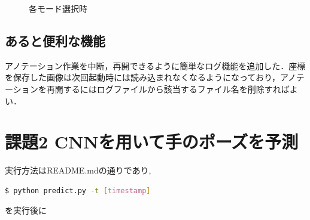 \documentclass[a4paper, 11pt]{article}
\begin{document}
\begin{figure}[H]
  \begin{center}
  \end{center}
	\caption{各モード選択時}
	\label{fig:set_keypoints}
\end{figure}

\subsection*{あると便利な機能}
アノテーション作業を中断，再開できるように簡単なログ機能を追加した．座標を保存した画像は次回起動時には読み込まれなくなるようになっており，アノテーションを再開するにはログファイルから該当するファイル名を削除すればよい．

\section*{課題2 CNNを用いて手のポーズを予測}
実行方法はREADME.mdの通りであり,

\begin{lstlisting}[language=bash]
  $ python predict.py -t [timestamp]
\end{lstlisting}

を実行後に
\end{document}
